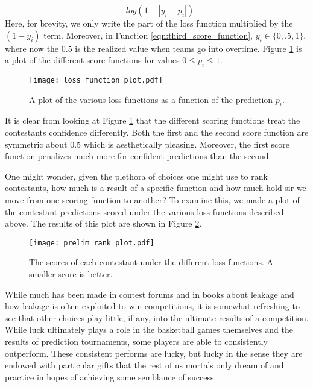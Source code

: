 \begin{equation}\label{eqn:third_score_function}
-log(1-|y_i-p_i|)
\end{equation} 
Here, for brevity, we only write the part of the loss function multiplied by the $(1-y_i)$ term. Moreover, in Function \ref{eqn:third_score_function}, $y_i \in \{0,.5,1\}$, where now the $0.5$ is the realized value when teams go into overtime. Figure \ref{fig:scoring_functions} is a plot of the different score functions for values $0\leq p_i \leq 1$.  


\begin{figure}[h]
\centering
\texttt{[image: loss\_function\_plot.pdf]}
\caption{A plot of the various loss functions as a function of the prediction $p_i$.  }
\label{fig:scoring_functions}
\end{figure}

It is clear from looking at Figure \ref{fig:scoring_functions} that the different scoring functions treat the contestants  confidence differently. Both the first and the second score function are symmetric about 0.5 which is aesthetically pleasing. Moreover, the first score function penalizes much more for confident predictions than the second. 

One might wonder, given the plethora of choices one might use to rank contestants, how much is a result of a specific function and how much hold sir we move from one scoring function to another? To examine this, we made a plot of the contestant predictions scored under the various loss functions described above. The results of this plot are shown in Figure \ref{fig:score_rank_plot}. 

  \begin{figure}[h]
\centering
\texttt{[image: prelim\_rank\_plot.pdf]}
\caption{The scores of each contestant under the different loss functions. A smaller score is better.  }
\label{fig:score_rank_plot}
\end{figure}



While much has been made in contest forums and in books \cite{schutt2013doing} about leakage and how leakage is often exploited to win competitions, it is somewhat refreshing to see that other choices play little, if any, into the ultimate results of a competition. While luck ultimately plays a role in the basketball games themselves and the results of prediction tournaments, some players are able to consistently outperform. These consistent performs are lucky, but lucky in the sense they are endowed with particular gifts that the rest of us mortals only dream of and practice in hopes of achieving some semblance of success.  